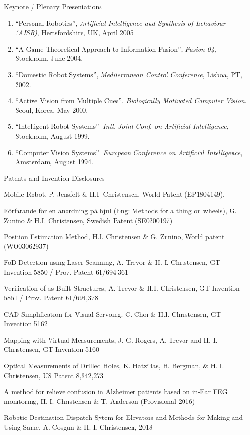 \documentclass{article}
\begin{document}
\begin{cv}
\begin{cvlist}{Keynote / Plenary Presentations}
\begin{enumerate}
{    on Robotics, Tokyo}, Dec. 2005.
  \item ``Personal Robotics'', {\em Artificial Intelligence and
    Synthesis of Behaviour (AISB)}, Hertsfordshire, UK, April 2005
  \item ``A Game Theoretical Approach to Information Fusion'', {\em
    Fusion-04}, Stockholm, June 2004.
  \item ``Domestic Robot Systems'', {\em Mediterranean Control
    Conference}, Lisboa, PT, 2002.
  \item ``Active Vision from Multiple Cues'', {\em Biologically
    Motivated Computer Vision}, Seoul, Korea, May 2000.
  \item ``Intelligent Robot Systems'', {\em Intl. Joint Conf. on
    Artificial Intelligence}, Stockholm, August 1999.
  \item ``Computer Vision Systems'', {\em European Conference on
    Artificial Intelligence}, Amsterdam, August 1994.
  \end{enumerate}
\end{cvlist}

\begin{cvlist}{Patents and Invention Disclosures}
\item Mobile Robot, P. Jensfelt \& H.I. Christensen, World Patent
  (EP1804149).
\item F{\"o}rfarande f{\"o}r en anordning p{\aa} hjul (Eng: Methods
  for a thing on wheels), G. Zunino \& H.I. Christensen, Swedish
  Patent (SE0200197)
\item Position Estimation Method, H.I. Christensen \& G. Zunino, World
  patent (WO03062937)
\item FoD Detection using Laser Scanning, A. Trevor \&
  H. I. Christensen, GT Invention 5850 / Prov. Patent 61/694,361
\item Verification of as Built Structures, A. Trevor \&
  H.I. Christensen, GT Invention 5851 / Prov. Patent 61/694,378
\item CAD Simplification for Visual Servoing. C. Choi \&
  H.I. Christensen, GT Invention 5162
\item Mapping with Virtual Measurements, J. G. Rogers, A. Trevor and
  H. I. Christensen, GT Invention 5160
\item  Optical Measurements of Drilled Holes, K. Hatzilias, H. Bergman,
  \& H. I. Christensen, US Patent 8,842,273
\item  A method for relieve confusion in Alzheimer patients based on
  in-Ear EEG monitoring, H. I. Christensen \& T. Anderson
  (Provisional 2016)
\item Robotic Destination Dispatch Sytem for Elevators and Methods for
  Making and Using Same, A. Cosgun \& H. I. Christensen, 2018
\end{cvlist}


\end{cv}
\end{document}
